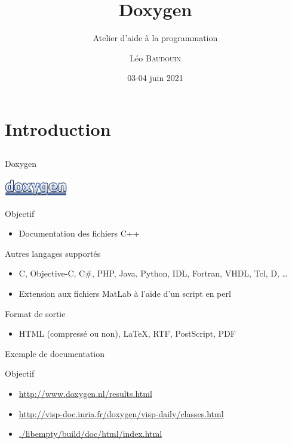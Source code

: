 \documentclass{beamer}
\title{Doxygen}
\subtitle{Atelier d'aide à la programmation}
\author{L\'eo \textsc{Baudouin}}
\institute{
  {\url{baudouin.leo @ gmail.com}}
}
\date{03-04 juin 2021}
\begin{document}
\begin{frame}
  \titlepage
\end{frame}

\section{Introduction}
\subsection{}

\begin{frame}{Doxygen}

\begin{center}
\includegraphics[width=0.3\linewidth]{images/doxygen-logo}
\end{center}

\begin{exampleblock}{Objectif}
\begin{itemize}
\item Documentation des fichiers C++
\end{itemize}
\end{exampleblock}

\begin{block}{Autres langages supportés}
\begin{itemize}
\item C, Objective-C, C\#, PHP, Java, Python, IDL, Fortran, VHDL, Tcl, D, \dots
\item Extension aux fichiers MatLab à l'aide d'un script en perl
\end{itemize}
\end{block}

\begin{block}{Format de sortie}
\begin{itemize}
\item HTML (compressé ou non), \LaTeX, RTF, PostScript, PDF
\end{itemize}
\end{block}
\end{frame}


\begin{frame}{Exemple de documentation}
\begin{block}{Objectif}
\begin{itemize}
\item \url{http://www.doxygen.nl/results.html}
\item \url{http://visp-doc.inria.fr/doxygen/visp-daily/classes.html}
\item \url{./libempty/build/doc/html/index.html}
\end{itemize}
\end{block}
\end{frame}
\end{document}
